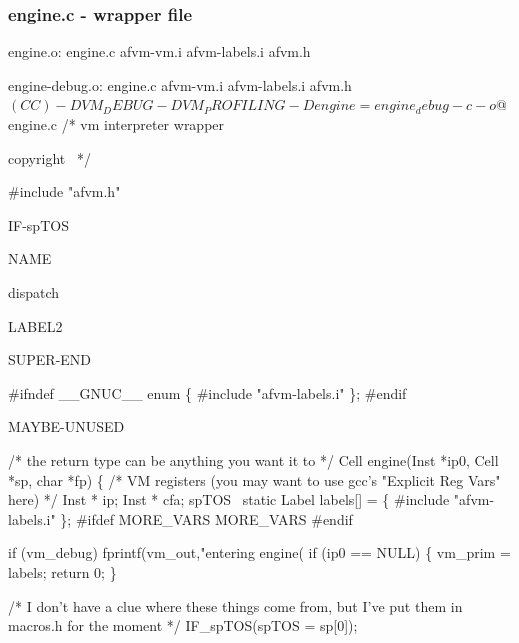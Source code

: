 \documentclass[10pt,english]{article}
\begin{document}
\subsubsection{engine.c - wrapper file\label{sub:engine.c---wrapper}}

\nwenddocs{}\endmoddef
engine.o: engine.c afvm-vm.i afvm-labels.i afvm.h

engine-debug.o: engine.c afvm-vm.i afvm-labels.i afvm.h
        $(CC) -DVM_DEBUG -DVM_PROFILING -Dengine=engine_debug -c -o $@ engine.c
\nwendcode{}\nwdocspar
\nwenddocs{}\endmoddef
/* vm interpreter wrapper

\LA{}copyright~{\nwtagstyle{}}\RA{}
*/

#include "afvm.h"

\LA{}IF-spTOS~{\nwtagstyle{}}\RA{}

\LA{}NAME~{\nwtagstyle{}}\RA{}

\LA{}dispatch~{\nwtagstyle{}}\RA{}

\LA{}LABEL2~{\nwtagstyle{}}\RA{}

\LA{}SUPER-END~{\nwtagstyle{}}\RA{}

#ifndef __GNUC__
enum \{
#include "afvm-labels.i"
\};
#endif

\LA{}MAYBE-UNUSED~{\nwtagstyle{}}\RA{}

/* the return type can be anything you want it to */
Cell engine(Inst *ip0, Cell *sp, char *fp)
\{
  /* VM registers (you may want to use gcc's "Explicit Reg Vars" here) */
  Inst * ip;
  Inst * cfa;
\LA{}spTOS~{\nwtagstyle{}}\RA{}
  static Label labels[] = \{
#include "afvm-labels.i"
  \};
#ifdef MORE_VARS
  MORE_VARS
#endif

  if (vm_debug)
      fprintf(vm_out,"entering engine(%
  if (ip0 == NULL) \{
    vm_prim = labels;
    return 0;
  \}

  /* I don't have a clue where these things come from,
     but I've put them in macros.h for the moment */
  IF_spTOS(spTOS = sp[0]);
\end{document}

